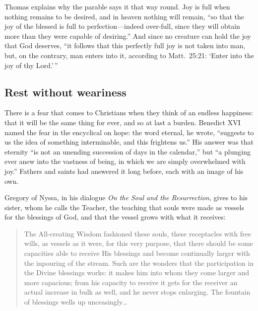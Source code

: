 Thomas explains why the parable says it that way round. Joy is full when nothing remains to be desired, and in heaven nothing will remain, ``so that the joy of the blessed is full to perfection---indeed over-full, since they will obtain more than they were capable of desiring.'' And since no creature can hold the joy that God deserves, ``it follows that this perfectly full joy is not taken into man, but, on the contrary, man enters into it, according to Matt.\ 25:21: `Enter into the joy of thy Lord.'\,''

\subsection{Rest without weariness}

There is a fear that comes to Christians when they think of an endless happiness: that it will be the same thing for ever, and so at last a burden. Benedict XVI named the fear in the encyclical on hope: the word eternal, he wrote, ``suggests to us the idea of something interminable, and this frightens us.'' His answer was that eternity ``is not an unending succession of days in the calendar,'' but ``a plunging ever anew into the vastness of being, in which we are simply overwhelmed with joy.'' Fathers and saints had answered it long before, each with an image of his own.

Gregory of Nyssa, in his dialogue \emph{On the Soul and the Resurrection}, gives to his sister, whom he calls the Teacher, the teaching that souls were made as vessels for the blessings of God, and that the vessel grows with what it receives:

\begin{quote}
The All-creating Wisdom fashioned these souls, these receptacles with free wills, as vessels as it were, for this very purpose, that there should be some capacities able to receive His blessings and become continually larger with the inpouring of the stream. Such are the wonders that the participation in the Divine blessings works: it makes him into whom they come larger and more capacious; from his capacity to receive it gets for the receiver an actual increase in bulk as well, and he never stops enlarging. The fountain of blessings wells up unceasingly\ldots{}
\end{quote}

